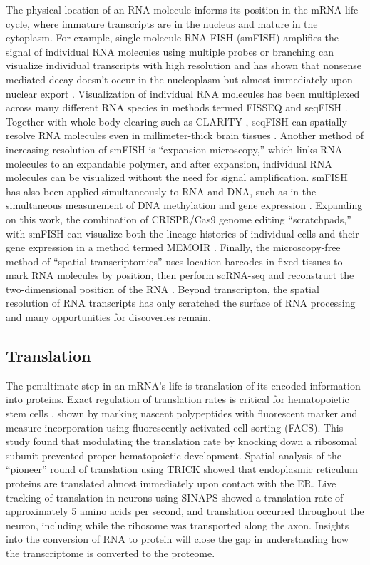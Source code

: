 The physical location of an RNA molecule informs its position in the mRNA life cycle, where immature transcripts are in the nucleus and mature in the cytoplasm. For example, single-molecule RNA-FISH (smFISH) amplifies the signal of individual RNA molecules using multiple probes or branching \cite{Itzkovitz2011-ex,Raj2009-ni,Raj2013-lz} can visualize individual transcripts with high resolution and has shown that nonsense mediated decay doesn't occur in the nucleoplasm but almost immediately upon nuclear export \cite{Trcek2013-qw}. Visualization of individual RNA molecules has been multiplexed across many different RNA species in methods termed FISSEQ and seqFISH \cite{Chen2015-pv,Lubeck2014-re,Shah2016-sn}. Together with whole body clearing such as CLARITY \cite{Yang2014-xq}, seqFISH can spatially resolve RNA molecules even in millimeter-thick brain tissues \cite{Shah2016-ut,Shah2016-sn}. Another method of increasing resolution of smFISH is ``expansion microscopy,'' which links RNA molecules to an expandable polymer, and after expansion, individual RNA molecules can be visualized without the need for signal amplification. smFISH has also been applied simultaneously to RNA and DNA, such as in the simultaneous measurement of DNA methylation and gene expression \cite{Singer2014-yu}. Expanding on this work, the combination of CRISPR/Cas9 genome editing ``scratchpads,'' with smFISH can visualize both the lineage histories of individual cells and their gene expression in a method termed MEMOIR \cite{Frieda2017-vv}. Finally, the microscopy-free method of ``spatial transcriptomics'' uses location barcodes in fixed tissues to mark RNA molecules by position, then perform scRNA-seq and reconstruct the two-dimensional position of the RNA \cite{Stahl2016-rd}. Beyond transcripton, the spatial resolution of RNA transcripts has only scratched the surface of RNA processing and many opportunities for discoveries remain.

\subsection{Translation}

The penultimate step in an mRNA's life is translation of its encoded information into proteins. Exact regulation of translation rates is critical for hematopoietic stem cells \cite{Liu2012-pu,Signer2014-zw}, shown by marking nascent polypeptides with fluorescent marker and measure incorporation using fluorescently-activated cell sorting (FACS). This study found that modulating the translation rate by knocking down a ribosomal subunit prevented proper hematopoietic development. Spatial analysis of the ``pioneer'' round of translation using TRICK \cite{Halstead2015-po} showed that endoplasmic reticulum proteins are translated almost immediately upon contact with the ER. Live tracking of translation in neurons using SINAPS \cite{Wu2016-ex} showed a translation rate of approximately 5 amino acids per second, and translation occurred throughout the neuron, including while the ribosome was transported along the axon. Insights into the conversion of RNA to protein will close the gap in understanding how the transcriptome is converted to the proteome.


